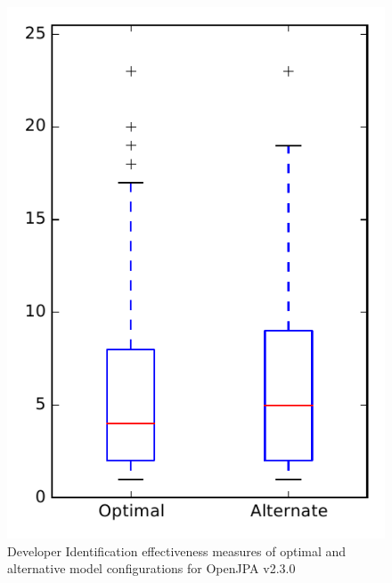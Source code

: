 
\begin{figure}
\centering
\includegraphics[height=0.4\textheight]{figures/combo/dit_rq1_openjpa}
\caption{Developer Identification effectiveness measures of optimal and alternative model configurations for OpenJPA v2.3.0}
\label{fig:combo:dit:rq1:openjpa}
\end{figure}

